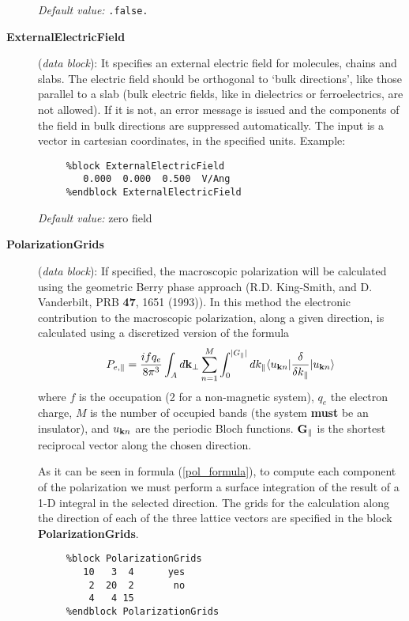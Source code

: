 \documentclass[11pt]{article}
\begin{document}
\begin{description}
{\it Default value:} {\tt .false.}
        
\item[{\bf ExternalElectricField}] ({\it data block}): 
It specifies an external electric field for molecules, chains and slabs.
The electric field should be orthogonal to `bulk directions', like
those parallel to a slab (bulk electric fields, like in
dielectrics or ferroelectrics, are not allowed). If it is not, an
error message is issued and the components of the field in bulk
directions are suppressed automatically. The input is a
vector in cartesian coordinates, in the specified units. Example:

\begin{verbatim}
     %block ExternalElectricField
        0.000  0.000  0.500  V/Ang
     %endblock ExternalElectricField
\end{verbatim}

{\it Default value:} zero field

\item[{\bf PolarizationGrids}] ({\it data block}):
If specified, the macroscopic polarization will be calculated using the
geometric Berry phase approach (R.D. King-Smith, and D. Vanderbilt,
PRB {\bf 47}, 1651 (1993)). In this method the electronic 
contribution to the macroscopic polarization, along a given direction, 
is calculated using
a discretized version of the formula
\begin{equation}
\label{pol_formula}
    P_{e,\parallel}={ifq_e \over 8\pi^3} \int_A d{\bf k}_\perp
    \sum_{n=1}^M \int_0^{|G_\parallel|} dk_{\parallel}
     \langle u_{{\bf k} n} |{\delta \over \delta k_{\parallel}} |
      u_{{\bf k} n} \rangle
\end{equation}
where $f$ is the occupation (2 for a non-magnetic system), 
$q_e$ the electron charge, $M$ is the number of occupied bands (the
system {\bf must} be an insulator), and $u_{{\bf k} n}$ are
the periodic Bloch functions. ${\bf G}_\parallel$ is the shortest
reciprocal vector along the chosen direction. 

As it can be seen in formula (\ref{pol_formula}), to compute each 
component of the polarization we must perform a surface integration
of the result of a 1-D integral in the selected direction. 
The grids for the calculation along the direction of each of the
three lattice vectors are specified in the block
{\bf PolarizationGrids}. 
\begin{verbatim}
     %block PolarizationGrids
        10   3  4      yes
         2  20  2       no
         4   4 15
     %endblock PolarizationGrids
\end{verbatim}      


\end{description}
\end{document}
